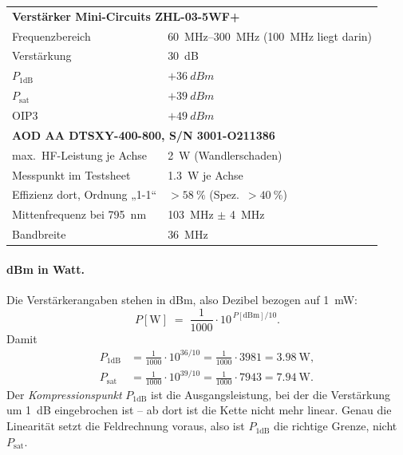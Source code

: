 \documentclass[11pt,a4paper]{article}
\begin{document}
\begin{center}
\begin{tabular}{ll}
  \toprule
  \multicolumn{2}{l}{\textbf{Verstärker Mini-Circuits ZHL-03-5WF+}}\\
  Frequenzbereich & \SIrange{60}{300}{\mega\hertz} (\SI{100}{\mega\hertz} liegt darin)\\
  Verstärkung & \SI{30}{\deci\bel}\\
  $P_{1\mathrm{dB}}$ & $+\SI{36}{dBm}$\\
  $P_\mathrm{sat}$ & $+\SI{39}{dBm}$\\
  OIP3 & $+\SI{49}{dBm}$\\
  \midrule
  \multicolumn{2}{l}{\textbf{AOD AA DTSXY-400-800, S/N 3001-O211386}}\\
  max.\ HF-Leistung je Achse & \SI{2}{\watt} (Wandlerschaden)\\
  Messpunkt im Testsheet & \SI{1.3}{\watt} je Achse\\
  Effizienz dort, Ordnung „1-1`` & $>\SI{58}{\percent}$ (Spez.\ $>\SI{40}{\percent}$)\\
  Mittenfrequenz bei \SI{795}{\nano\meter} & \SI{103}{\mega\hertz} $\pm$ \SI{4}{\mega\hertz}\\
  Bandbreite & \SI{36}{\mega\hertz}\\
  \bottomrule
\end{tabular}
\end{center}

\paragraph{dBm in Watt.}
Die Verstärkerangaben stehen in dBm, also Dezibel bezogen auf
\SI{1}{\milli\watt}:
\begin{equation}
  P[\mathrm{W}] \;=\; \frac{1}{1000}\cdot 10^{\,P[\mathrm{dBm}]/10} .
\end{equation}
Damit
\begin{align}
  P_{1\mathrm{dB}} &= \tfrac{1}{1000}\cdot10^{36/10} = \tfrac{1}{1000}\cdot 3981 = \SI{3.98}{\watt},\\
  P_\mathrm{sat}   &= \tfrac{1}{1000}\cdot10^{39/10} = \tfrac{1}{1000}\cdot 7943 = \SI{7.94}{\watt}.
\end{align}
Der \emph{Kompressionspunkt} $P_{1\mathrm{dB}}$ ist die Ausgangsleistung, bei
der die Verstärkung um \SI{1}{\deci\bel} eingebrochen ist -- ab dort ist die
Kette nicht mehr linear. Genau die Linearität setzt die Feldrechnung voraus,
also ist $P_{1\mathrm{dB}}$ die richtige Grenze, nicht $P_\mathrm{sat}$.
\end{document}
